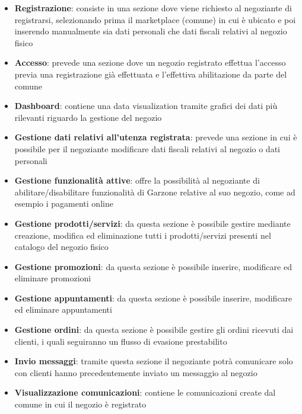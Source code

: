 \begin{itemize}
    \item \textbf{Registrazione}: consiste in una sezione dove viene richiesto al negoziante di registrarsi, selezionando prima il marketplace (comune) in cui è ubicato e poi inserendo manualmente sia dati personali che dati fiscali relativi al negozio fisico
    \item \textbf{Accesso}: prevede una sezione dove un negozio registrato effettua l'accesso previa una registrazione già effettuata e l'effettiva abilitazione da parte del comune
    \item \textbf{Dashboard}: contiene una data visualization tramite grafici dei dati più rilevanti riguardo la gestione del negozio
    \item \textbf{Gestione dati relativi all'utenza registrata}: prevede una sezione in cui è possibile per il negoziante modificare dati fiscali relativi al negozio o dati personali
    \item \textbf{Gestione funzionalità attive}: offre la possibilità al negoziante di abilitare/disabilitare funzionalità di Garzone relative al suo negozio, come ad esempio i pagamenti online
    \item \textbf{Gestione prodotti/servizi}: da questa sezione è possibile gestire mediante creazione, modifica ed eliminazione tutti i prodotti/servizi presenti nel catalogo del negozio fisico
    \item \textbf{Gestione promozioni}: da questa sezione è possibile inserire, modificare ed eliminare promozioni
    \item \textbf{Gestione appuntamenti}: da questa sezione è possibile inserire, modificare ed eliminare appuntamenti
    \item \textbf{Gestione ordini}: da questa sezione è possibile gestire gli ordini ricevuti dai clienti, i quali seguiranno un flusso di evasione prestabilito
    \item \textbf{Invio messaggi}: tramite questa sezione il negoziante potrà comunicare solo con clienti hanno precedentemente inviato un messaggio al negozio
    \item \textbf{Visualizzazione comunicazioni}: contiene le comunicazioni create dal comune in cui il negozio è registrato
\end{itemize}
